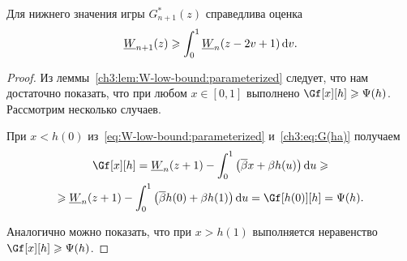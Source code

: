{\begin{theorem}\label{ch3:thm:W-bound}
  Для нижнего значения игры $G_{n+1}^*(z)$ справедлива оценка
  \begin{equation*}
    \LW{n+1}(z) \geqslant \int_0^1 \LW{n}(z - 2v + 1) \di v.
  \end{equation*}
\end{theorem}
\begin{proof}
  Из леммы~\ref{ch3:lem:W-low-bound:parameterized} следует, что нам достаточно показать, что при любом $x \in [0, 1]$ выполнено $\Gf[x][h] \geqslant \Psi(h)$.
  Рассмотрим несколько случаев.

  При $x < h(0)$ из~\eqref{eq:W-low-bound:parameterized} и~\eqref{ch3:eq:G(ha)} получаем
  \begin{multline*}
    \Gf[x][h] =
    \LW{n}(z + 1) - \int_0^1 \left( \DCo x + \Co h(u) \right) \di u \geqslant \\
    \geqslant \LW{n}(z + 1) - \int_0^1 \left( \DCo h(0) + \Co h(1) \right) \di
    u = \Gf[h(0)][h] = \Psi(h).
  \end{multline*}

  Аналогично можно показать, что при $x > h(1)$ выполняется неравенство $\Gf[x][h] \geqslant \Psi(h)$.


\end{proof}}
